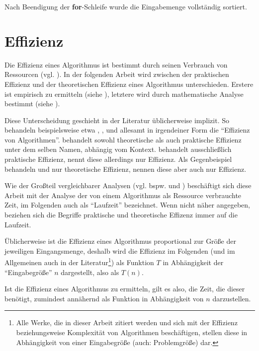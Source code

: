 Nach Beendigung der \textbf{for}-Schleife wurde die Eingabemenge vollständig sortiert.

\section{Effizienz}
\label{sec:algo-effizienz}

Die Effizienz eines Algorithmus ist bestimmt durch seinen Verbrauch von Ressourcen (vgl. \cite{rp2013}). In der folgenden Arbeit wird zwischen der praktischen Effizienz und der theoretischen Effizienz eines Algorithmus unterschieden. Erstere ist empirisch zu ermitteln (siehe ), letztere wird durch mathematische Analyse bestimmt (siehe ).

Diese Unterscheidung geschieht in der Literatur üblicherweise implizit. So behandeln beispielsweise etwa \cite{mcg2012}, \cite{llx2012}, \cite{rp2013} und \cite{hsr1997} allesamt in irgendeiner Form die \enquote{Effizienz von Algorithmen}. \cite{mcg2012} behandelt sowohl theoretische als auch praktische Effizienz unter dem selben Namen, abhängig vom Kontext. \cite{llx2012} behandelt ausschließlich praktische Effizienz, nennt diese allerdings nur Effizienz. Als Gegenbeispiel behandeln \cite{rp2013} und \cite{hsr1997} nur theoretische Effizienz, nennen diese aber auch nur Effizienz.

Wie der Großteil vergleichbarer Analysen (vgl. bspw. \cite[23]{clrs2001} und \cite[58]{sha2011}) beschäftigt sich diese Arbeit mit der Analyse der von einem Algorithmus als Ressource verbrauchte Zeit, im Folgenden auch als \enquote{Laufzeit} bezeichnet. Wenn nicht näher angegeben, beziehen sich die Begriffe praktische und theoretische Effizenz immer auf die Laufzeit.

Üblicherweise ist die Effizienz eines Algorithmus proportional zur Größe der jeweiligen Eingangsmenge, deshalb wird die Effizienz im Folgenden (und im Allgemeinen auch in der Literatur\footnote{Alle Werke, die in dieser Arbeit zitiert werden und sich mit der Effizienz beziehungsweise Komplexität von Algorithmen beschäftigen, stellen diese in Abhängigkeit von einer Eingabegröße (auch: Problemgröße) dar.}) als Funktion $T$ in Abhängigkeit der \enquote{Eingabegröße} $n$ dargestellt, also als $T(n)$.

Ist die Effizienz eines Algorithmus zu ermitteln, gilt es also, die Zeit, die dieser benötigt, zumindest annähernd als Funktion in Abhängigkeit von $n$ darzustellen.
